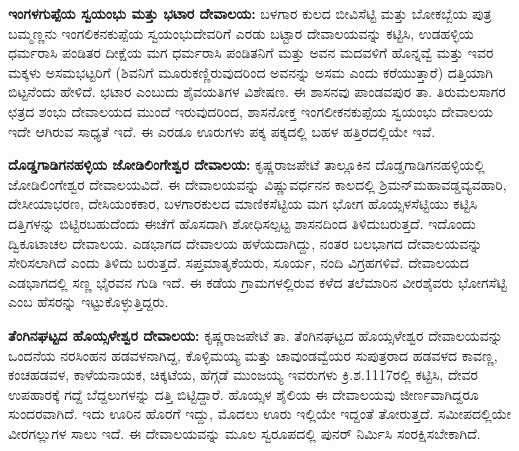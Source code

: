 \textbf{ಇಂಗಳಗುಪ್ಪೆಯ ಸ್ವಯಂಭು ಮತ್ತು ಭಟಾರ ದೇವಾಲಯ:} ಬಳಗಾರ ಕುಲದ ಬೀವಿಸೆಟ್ಟಿ ಮತ್ತು ಬೋಕಬ್ಬೆಯ ಪುತ್ರ ಬಮ್ಮಣ್ಣನು ಇಂಗಲಿಕನಕುಪ್ಪೆಯ ಸ್ವಯಂಭುದೇವರಿಗೆ ಎರಡು ಬಟ್ಟಾರ ದೇವಾಲಯವನ್ನು ಕಟ್ಟಿಸಿ, ಉಡಹಳ್ಳಿಯ ಧರ್ಮರಾಸಿ ಪಂಡಿತರ ದೀಕ್ಷೆಯ ಮಗ ಧರ್ಮರಾಸಿ ಪಂಡಿತನಿಗೆ ಮತ್ತು ಅವನ ಮದವಳಿಗೆ ಹೊನ್ನವ್ವೆ ಮತ್ತು ಇವರ ಮಕ್ಕಳು ಅಸಮಭಟ್ಟರಿಗೆ (ಶಿವನಿಗೆ ಮೂರುಕಣ್ಣಿರುವುದರಿಂದ ಅವನನ್ನು ಅಸಮ ಎಂದು ಕರೆಯುತ್ತಾರೆ) ದತ್ತಿಯಾಗಿ ಬಿಟ್ಟನೆಂದು ಹೇಳಿದೆ. ಭಟಾರ ಎಂಬುದು ಶೈವಯತಿಗಳ ವಿಶೇಷಣ. ಈ ಶಾಸನವು ಪಾಂಡವಪುರ ತಾ. ತಿರುಮಲಸಾಗರ ಛತ್ರದ ಶಂಭು ದೇವಾಲಯದ ಮುಂದೆ ಇರುವುದರಿಂದ, ಶಾಸನೋಕ್ತ ಇಂಗಲೀಕನಕುಪ್ಪೆಯ ಸ್ವಯಂಭು ದೇವಾಲಯ ಇದೇ ಆಗಿರುವ ಸಾಧ್ಯತೆ ಇದೆ. ಈ ಎರಡೂ ಊರುಗಳು ಪಕ್ಕ ಪಕ್ಕದಲ್ಲಿ ಬಹಳ ಹತ್ತಿರದಲ್ಲಿಯೇ ಇವೆ.

\textbf{ದೊಡ್ಡಗಾಡಿಗನಹಳ್ಳಿಯ ಜೋಡಿಲಿಂಗೇಶ್ವರ ದೇವಾಲಯ:} ಕೃಷ್ಣರಾಜಪೇಟೆ ತಾಲ್ಲೂಕಿನ ದೊಡ್ಡಗಾಡಿಗನಹಳ್ಳಿಯಲ್ಲಿ ಜೋಡಿಲಿಂಗೇಶ್ವರ ದೇವಾಲಯವಿದೆ. ಈ ದೇವಾಲಯವನ್ನು ವಿಷ್ಣುವರ್ಧನನ ಕಾಲದಲ್ಲಿ ಶ್ರಿಮನ್​ ಮಹಾವಡ್ಡವ್ಯವಹಾರಿ, ದೇಸೀಯಾಭರಣ, ದೇಸಿಯಂಕಕಾರ, ಬಳಗಾರಕುಲದ ಮಾಣಿಕಸೆಟ್ಟಿಯ ಮಗ ಭೋಗ ಹೊಯ್ಸಳಸೆಟ್ಟಿಯು ಕಟ್ಟಿಸಿ ದತ್ತಿಗಳನ್ನು ಬಿಟ್ಟಿರಬಹುದೆಂದು ಈಚೆಗೆ ಹೊಸದಾಗಿ ಶೋಧಿಸಲ್ಪಟ್ಟ ಶಾಸನದಿಂದ ತಿಳಿದುಬರುತ್ತದೆ. ಇದೊಂದು ದ್ವಿಕೂಟಾಚಲ ದೇವಾಲಯ. ಎಡಭಾಗದ ದೇವಾಲಯ ಹಳೆಯದಾಗಿದ್ದು, ನಂತರ ಬಲಭಾಗದ ದೇವಾಲಯವನ್ನು ಸೇರಿಸಲಾಗಿದೆ ಎಂದು ತಿಳಿದು ಬರುತ್ತದೆ. ಸಪ್ತಮಾತೃಕೆಯರು, ಸೂರ್ಯ, ನಂದಿ ವಿಗ್ರಹಗಳಿವೆ. ದೇವಾಲಯದ ಎಡಭಾಗದಲ್ಲಿ ಸಣ್ಣ ಭೈರವನ ಗುಡಿ ಇದೆ. ಈ ಕಡೆಯ ಗ್ರಾಮಗಳಲ್ಲಿರುವ ಕಳೆದ ತಲೆಮಾರಿನ ವೀರಶೈವರು ಭೋಗಸೆಟ್ಟಿ ಎಂಬ ಹೆಸರನ್ನು ಇಟ್ಟುಕೊಳ್ಳುತ್ತಿದ್ದರು.

\textbf{ತೆಂಗಿನಘಟ್ಟದ ಹೊಯ್ಸಳೇಶ್ವರ ದೇವಾಲಯ:} ಕೃಷ್ಣರಾಜಪೇಟೆ ತಾ. ತೆಂಗಿನಘಟ್ಟದ ಹೊಯ್ಸಳೇಶ್ವರ ದೇವಾಲಯ\-ವನ್ನು ಒಂದನೆಯ ನರಸಿಂಹನ ಹಡವಳನಾಗಿದ್ದ, ಕೊಳ್ಳಿಮಯ್ಯ ಮತ್ತು ಚಾವುಂಡವ್ವೆಯರ ಸುಪುತ್ರರಾದ ಹಡವಳದ ಕಾವಣ್ಣ, ಕಂಚಹಡವಳ, ಕಾಳೆಯನಾಯಕ, ಚಿಕ್ಕಟೆಯ, ಹೆಗ್ಗಡೆ ಮುಂಜಯ್ಯ ಇವರುಗಳು ಕ್ರಿ.ಶ.1117ರಲ್ಲಿ ಕಟ್ಟಿಸಿ, ದೇವರ ಉಪಹಾರಕ್ಕೆ ಗದ್ದೆ ಬೆದ್ದಲುಗಳನ್ನು ದತ್ತಿ ಬಿಟ್ಟಿದ್ದಾರೆ. ಹೊಯ್ಸಳ ಶೈಲಿಯ ಈ ದೇವಾಲಯವು ಜೀರ್ಣವಾಗಿದ್ದರೂ ಸುಂದರವಾಗಿದೆ. ಇದು ಊರಿನ ಹೊರಗೆ ಇದ್ದು, ಮೊದಲು ಊರು ಇಲ್ಲಿಯೇ ಇದ್ದಂತೆ ತೋರುತ್ತದೆ. ಸಮೀಪದಲ್ಲಿಯೇ ವೀರಗಲ್ಲುಗಳ ಸಾಲು ಇದೆ. ಈ ದೇವಾಲಯವನ್ನು ಮೂಲ ಸ್ವರೂಪದಲ್ಲಿ ಪುನರ್ ನಿರ್ಮಿಸಿ ಸಂರಕ್ಷಿಸಬೇಕಾಗಿದೆ.

